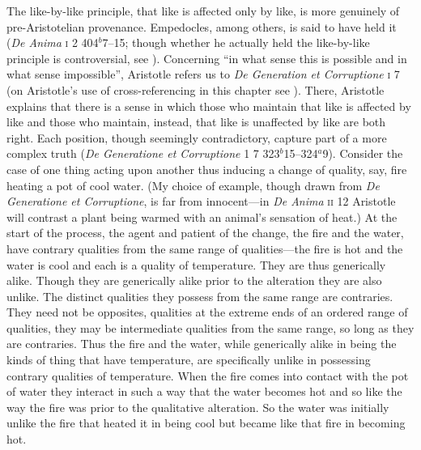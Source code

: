 The like-by-like principle, that like is affected only by like, is more genuinely of pre-Aristotelian provenance. Empedocles, among others, is said to have held it (\emph{De Anima} \textsc{i} 2 404\( ^{b} \)7--15; though whether he actually held the like-by-like principle is controversial, see \citealt{Kamtekar:2009fk}). Concerning ``in what sense this is possible and in what sense impossible'', Aristotle refers us to \emph{De Generation et Corruptione} \textsc{i} 7 (on Aristotle's use of cross-referencing in this chapter see \citealt{Burnyeat:2002an}). There, Aristotle explains that there is a sense in which those who maintain that like is affected by like and those who maintain, instead, that like is unaffected by like are both right. Each position, though seemingly contradictory, capture part of a more complex truth (\emph{De Generatione et Corruptione} \textsc{1} 7 323\( ^{b} \)15--324\( ^{a} \)9). Consider the case of one thing acting upon another thus inducing a change of quality, say, fire heating a pot of cool water. (My choice of example, though drawn from \emph{De Generatione et Corruptione}, is far from innocent---in \emph{De Anima} \textsc{ii} 12 Aristotle will contrast a plant being warmed with an animal's sensation of heat.) At the start of the process, the agent and patient of the change, the fire and the water, have contrary qualities from the same range of qualities---the fire is hot and the water is cool and each is a quality of temperature. They are thus generically alike. Though they are generically alike prior to the alteration they are also unlike. The distinct qualities they possess from the same range are contraries. They need not be opposites, qualities at the extreme ends of an ordered range of qualities, they may be intermediate qualities from the same range, so long as they are contraries. Thus the fire and the water, while generically alike in being the kinds of thing that have temperature, are specifically unlike in possessing contrary qualities of temperature. When the fire comes into contact with the pot of water they interact in such a way that the water becomes hot and so like the way the fire was prior to the qualitative alteration. So the water was initially unlike the fire that heated it in being cool but became like that fire in becoming hot. 

